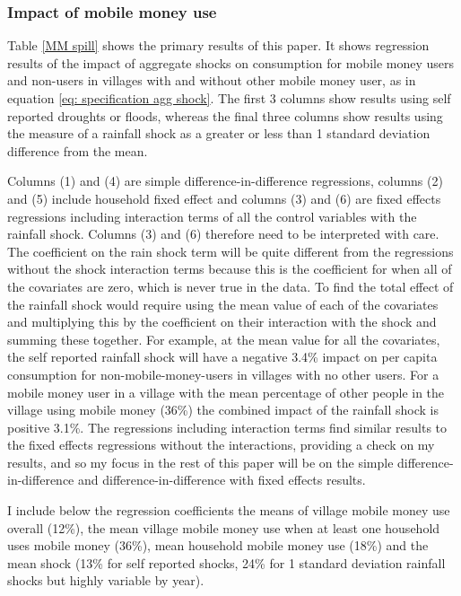 \subsubsection{Impact of mobile money use}
Table \ref{MM spill} shows the primary results of this paper. It shows regression results of the impact of aggregate shocks on consumption for mobile money users and non-users in villages with and without other mobile money user, as in equation \eqref{eq: specification agg shock}. The first 3 columns show results using self reported droughts or floods, whereas the final three columns show results using the measure of a rainfall shock as a greater or less than 1 standard deviation difference from the mean.     

Columns (1) and (4) are simple difference-in-difference regressions, columns (2) and (5) include household fixed effect  and columns (3) and (6) are fixed effects regressions including interaction terms of all the control variables with the rainfall shock. Columns (3) and (6) therefore need to be interpreted with care. The coefficient on the rain shock term will be quite different from the regressions without the shock interaction terms because this is the coefficient for when all of the covariates are zero, which is never true in the data. To find the total effect of the rainfall shock  would require using the mean value of each of the covariates and multiplying this by the coefficient on their interaction with the shock and summing these together. For example, at the mean value for all the covariates, the self reported rainfall shock will have a negative 3.4\% impact on per capita consumption for non-mobile-money-users in villages with no other users. For a mobile money user in a village with the mean percentage of other people in the village using mobile money (36\%) the combined impact of the rainfall shock is positive 3.1\%. The regressions including interaction terms find similar results to the fixed effects regressions without the interactions, providing a check on my results, and so my focus in the rest of this paper will be on the simple difference-in-difference and difference-in-difference with fixed effects results. 

I include below the regression coefficients the means of village mobile money use overall (12\%), the mean village mobile money use when at least one household uses mobile money (36\%), mean household mobile money use (18\%) and the mean shock (13\% for self reported shocks, 24\% for 1 standard deviation rainfall shocks but highly variable by year).


